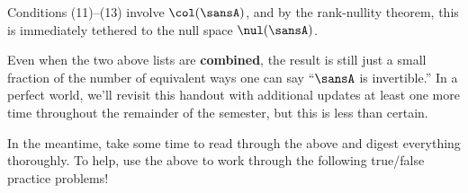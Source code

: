 \documentclass[12 pt]{article}
\begin{document}
Conditions (11)--(13) involve $\col(\sansA)$, and by the rank-nullity theorem, this is immediately tethered to the null space $\nul(\sansA)$.




\vspace{3mm}\noindent Even when the two above lists are \textbf{combined}, the result is still just a small fraction of the number of equivalent ways one can say ``$\sansA$ is invertible.'' In a perfect world, we'll revisit this handout with additional updates at least one more time throughout the remainder of the semester, but this is less than certain.

In the meantime, take some time to read through the above and digest everything thoroughly. To help, use the above to work through the following true/false practice problems!

\vspace{3mm}
\end{document}
